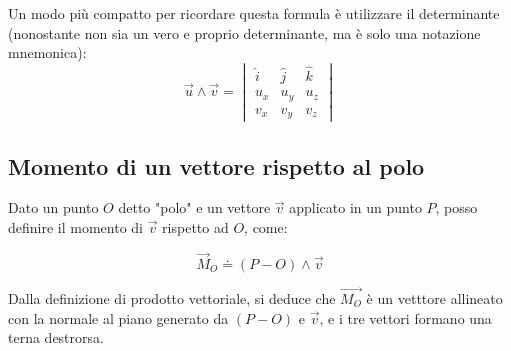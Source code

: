 Un modo più compatto per ricordare questa formula è utilizzare il determinante (nonostante non sia un vero e proprio determinante, ma è solo una notazione mnemonica):
\begin{equation*}
    \vec u \wedge \vec v = \begin{vmatrix}
    \hat i & \hat j & \hat k \\
    u_x & u_y & u_z \\
    v_x & v_y & v_z
    \end{vmatrix}
\end{equation*}

\subsection{Momento di un vettore rispetto al polo}
Dato un punto $O$ detto "polo" e un vettore $\vec v$ applicato in un punto $P$, posso definire il momento di $\vec v$ rispetto ad $O$, come:

\begin{minipage}
    {0.45\textwidth}
    \begin{equation*}
        \vec M_O \doteq (P-O) \wedge \vec v
    \end{equation*}

    Dalla definizione di prodotto vettoriale, si deduce che $\vec{M_O}$ è un vetttore allineato con la normale al piano generato da $(P-O)$ e $\vec v$, e i tre vettori formano una terna destrorsa.
\end{minipage}
\begin{minipage}
    {0.45\textwidth}
    \begin{center}
    \end{center}
\end{minipage}

